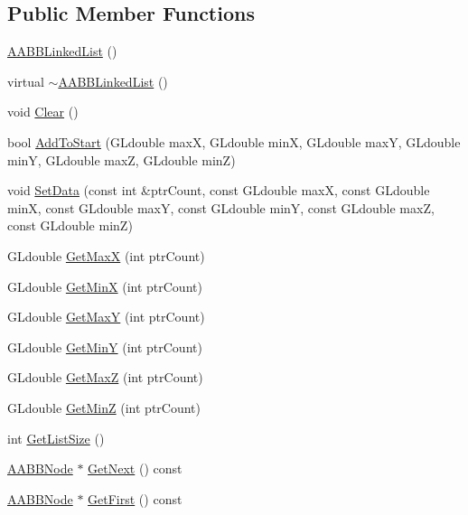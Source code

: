 \subsection*{Public Member Functions}
\begin{DoxyCompactItemize}
\item 
\hyperlink{class_a_a_b_b_linked_list_a2da1cd31c139b1ff1dd058f89c05c392}{A\+A\+B\+B\+Linked\+List} ()
\item 
virtual \hyperlink{class_a_a_b_b_linked_list_a045b677f4cceafb09d188e7a08f5e065}{$\sim$\+A\+A\+B\+B\+Linked\+List} ()
\item 
void \hyperlink{class_a_a_b_b_linked_list_a91220ba141deab9a3da2ec7ca6396436}{Clear} ()
\item 
bool \hyperlink{class_a_a_b_b_linked_list_a0dda8d1e7b9d5a2721b518d03b141664}{Add\+To\+Start} (G\+Ldouble maxX, G\+Ldouble minX, G\+Ldouble maxY, G\+Ldouble minY, G\+Ldouble maxZ, G\+Ldouble minZ)
\item 
void \hyperlink{class_a_a_b_b_linked_list_a9466a3aaffb597d9976259726b44463a}{Set\+Data} (const int \&ptr\+Count, const G\+Ldouble maxX, const G\+Ldouble minX, const G\+Ldouble maxY, const G\+Ldouble minY, const G\+Ldouble maxZ, const G\+Ldouble minZ)
\item 
G\+Ldouble \hyperlink{class_a_a_b_b_linked_list_a8e5dfc22a5b09a5439c7d48c777f21b6}{Get\+MaxX} (int ptr\+Count)
\item 
G\+Ldouble \hyperlink{class_a_a_b_b_linked_list_a01b738ef73d102240bc9bd54044c2a46}{Get\+MinX} (int ptr\+Count)
\item 
G\+Ldouble \hyperlink{class_a_a_b_b_linked_list_a06e37c604e86a670fc6657aac7ada31b}{Get\+MaxY} (int ptr\+Count)
\item 
G\+Ldouble \hyperlink{class_a_a_b_b_linked_list_aa59cbdbfb2012f733010283639a27584}{Get\+MinY} (int ptr\+Count)
\item 
G\+Ldouble \hyperlink{class_a_a_b_b_linked_list_af728cb9e63fe37667356ec4a74d9bb09}{Get\+MaxZ} (int ptr\+Count)
\item 
G\+Ldouble \hyperlink{class_a_a_b_b_linked_list_a93270a86be1d2f63aca450f7ef39d130}{Get\+MinZ} (int ptr\+Count)
\item 
int \hyperlink{class_a_a_b_b_linked_list_a42ebbd212e1058adab56b5829dedffca}{Get\+List\+Size} ()
\item 
\hyperlink{class_a_a_b_b_node}{A\+A\+B\+B\+Node} $\ast$ \hyperlink{class_a_a_b_b_linked_list_a8843e719c2db1f73087fe772a39fa1af}{Get\+Next} () const 
\item 
\hyperlink{class_a_a_b_b_node}{A\+A\+B\+B\+Node} $\ast$ \hyperlink{class_a_a_b_b_linked_list_a51b92571c3e95ca4b3906a8a6aae547f}{Get\+First} () const 
\end{DoxyCompactItemize}

